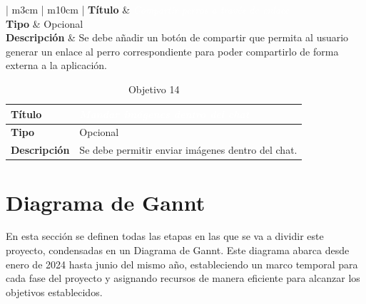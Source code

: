 \documentclass[a4paper, 12pt]{article}
\begin{document}
\begin{table}[H]
	\captionsetup{width=0.95\linewidth}%
   	\captionsetup{singlelinecheck=false}%
	\captionsetup{font=bf}
	\caption{Objetivo 13}
	\begin{tabular}{ | m{3cm} | m{10cm} | }
		\hline {}\textbf{Título} &  \textcolor{white}{\textit{Compartir perros a través de enlace}}  \\ \hline
		\textbf{Tipo} & Opcional \\ \hline
		\textbf{Descripción} & Se debe añadir un botón de compartir que permita al usuario generar un enlace al perro correspondiente para poder compartirlo de forma externa a la aplicación. \\ \hline
	\end{tabular}
\end{table}  

\begin{table}[H]
	\captionsetup{width=0.95\linewidth}%
   	\captionsetup{singlelinecheck=false}%
	\captionsetup{font=bf}
	\caption{Objetivo 14}
	\begin{tabular}{ | m{3cm} | m{10cm} | }
		\hline \cellcolor{lightgray}\textbf{Título} & \cellcolor{gray} \textcolor{white}{\textit{Mandar imágenes dentro del chat}}  \\ \hline
		\cellcolor{lightgray}\textbf{Tipo} & Opcional \\ \hline
		\cellcolor{lightgray}\textbf{Descripción} & Se debe permitir enviar imágenes dentro del chat. \\ \hline
	\end{tabular}
\end{table} 

\newpage

\section{Diagrama de Gannt}

En esta sección se definen todas las etapas en las que se va a dividir este proyecto, condensadas en un Diagrama de Gannt. Este diagrama abarca desde enero de 2024 hasta junio del mismo año, estableciendo un marco temporal para cada fase del proyecto y asignando recursos de manera eficiente para alcanzar los objetivos establecidos.
\end{document}
